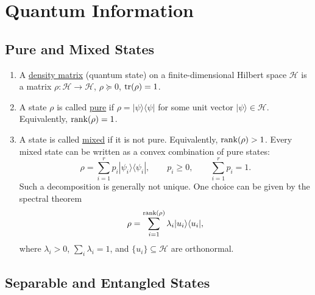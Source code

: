 \section{Quantum Information}
\label{sec:quantum-information}

\subsection{Pure and Mixed States}

\begin{enumerate}
    \item A \underline{density matrix} (quantum state) on a finite-dimensional Hilbert space $\mathcal{H}$ is a matrix
    $\rho: \mathcal{H} \to \mathcal{H}$, $\rho \succeq 0$, $\operatorname{tr}(\rho)=1$.
    \item A state $\rho$ is called \underline{pure} if
    $\rho = |\psi\rangle\langle\psi|$ for some unit vector $|\psi\rangle\in\mathcal{H}$. Equivalently,
    $\operatorname{rank}(\rho)=1$.

    \item A state is called \underline{mixed} if it is not pure. Equivalently, $\operatorname{rank}(\rho)>1$.
    Every mixed state can be written as a convex combination of pure states:
    \[
        \rho
        =
        \sum_{i=1}^r
        p_i |\psi_i\rangle\langle\psi_i|,
        \qquad
        p_i\geq 0,
        \qquad
        \sum_{i=1}^r p_i=1.
    \]
    Such a decomposition is generally not unique. One choice can be given by the spectral theorem
    \[
        \rho
        =
        \sum_{i=1}^{\operatorname{rank}(\rho)}
        \lambda_i
        |u_i\rangle\langle u_i|,
    \]
    where $\lambda_i>0$, $\sum_i \lambda_i=1$, and $\{u_i\}\subseteq \mathcal{H}$ are orthonormal.
\end{enumerate}

\subsection{Separable and Entangled States}

